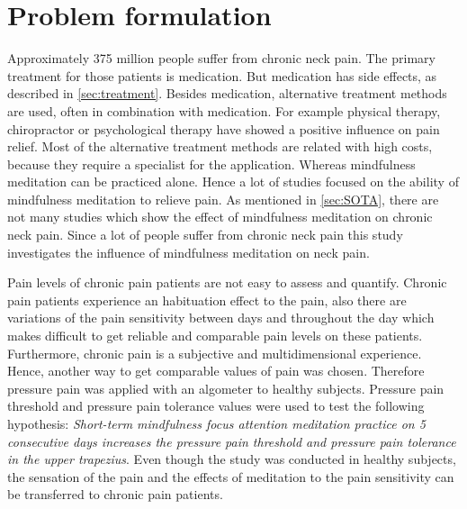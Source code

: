 \chapter{Problem formulation}

Approximately 375 million people suffer from chronic neck pain. The primary treatment for those patients is medication. But medication has side effects, as described in \ref{sec:treatment}.  Besides medication, alternative treatment methods are used, often in combination with medication. For example physical therapy, chiropractor or psychological therapy have showed a positive influence on pain relief. Most of the alternative treatment methods are related with high costs, because they require a specialist for the application. Whereas mindfulness meditation can be practiced alone. Hence a lot of studies focused on the ability of mindfulness meditation to relieve pain.
As mentioned in \ref{sec:SOTA}, there are not many studies which show the effect of mindfulness meditation on chronic neck pain. Since a lot of people suffer from chronic neck pain this study investigates the influence of mindfulness meditation on neck pain. 


Pain levels of chronic pain patients are not easy to assess and quantify. Chronic pain patients experience an habituation effect to the pain, also there are variations of the pain sensitivity between days and throughout the day which makes difficult to get reliable and comparable pain levels on these patients. Furthermore, chronic pain is a subjective and multidimensional experience.
Hence, another way to get comparable values of pain was chosen. Therefore pressure pain was applied with an algometer to healthy subjects. Pressure pain threshold and pressure pain tolerance values were used to test the following hypothesis:
\textit{Short-term mindfulness focus attention meditation practice on 5 consecutive days increases the pressure pain threshold and pressure pain tolerance in the upper trapezius}. Even though the study was conducted in healthy subjects, the sensation of the pain and the effects of meditation to the pain sensitivity can be transferred to chronic pain patients.


